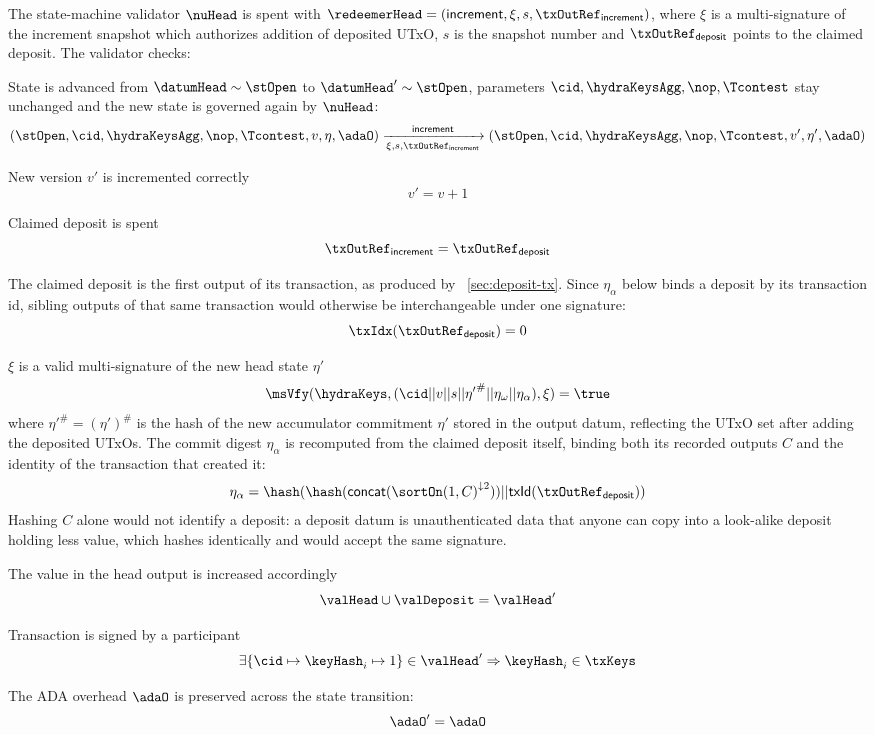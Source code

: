 \noindent The state-machine validator $\nuHead$ is spent with
$\redeemerHead = (\mathsf{increment}, \xi, s, \txOutRef_{\mathsf{increment}})$,
where $\xi$ is a multi-signature of the increment snapshot which authorizes
addition of deposited UTxO, $s$ is the snapshot number and
$\txOutRef_{\mathsf{deposit}}$ points to the claimed deposit. The validator
checks:
\begin{menumerate}
	\item State is advanced from $\datumHead \sim \stOpen$ to
	$\datumHead' \sim \stOpen$, parameters $\cid,\hydraKeysAgg,\nop,\Tcontest$
	stay unchanged and the new state is governed again by $\nuHead$:
	\[
		(\stOpen,\cid,\hydraKeysAgg,\nop,\Tcontest,v,\eta,\adaO) \xrightarrow[\xi, s, \txOutRef_{\mathsf{increment}}]{\mathsf{increment}} (\stOpen,\cid,\hydraKeysAgg,\nop,\Tcontest,v',\eta',\adaO)
	\]
	\item New version $v'$ is incremented correctly
	\[
		v' = v + 1
	\]
	\item Claimed deposit is spent
	\[
		\txOutRef_{\mathsf{increment}} = \txOutRef_{\mathsf{deposit}}
	\]
	\item The claimed deposit is the first output of its transaction, as produced
	by \mtxDeposit{}~\ref{sec:deposit-tx}. Since $\eta_{\alpha}$ below binds a
	deposit by its transaction id, sibling outputs of that same transaction would
	otherwise be interchangeable under one signature:
	\[
		\txIdx(\txOutRef_{\mathsf{deposit}}) = 0
	\]
	\item $\xi$ is a valid multi-signature of the new head state $\eta'$
	\[
		\msVfy(\hydraKeys,(\cid || v || s || {\eta'}^{\#} || \eta_{\omega} || \eta_{\alpha}),\xi) = \true
	\]
	where ${\eta'}^{\#} = (\eta')^{\#}$ is the hash of the new accumulator commitment $\eta'$
	stored in the output datum, reflecting the UTxO set after adding the deposited UTxOs.
	The commit digest $\eta_{\alpha}$ is recomputed from the claimed deposit itself,
	binding both its recorded outputs $C$ and the identity of the transaction that
	created it:
	\[
		\eta_{\alpha} = \hash(\hash(\mathsf{concat}({\sortOn(1, C)}^{\downarrow2})) || \mathsf{txId}(\txOutRef_{\mathsf{deposit}}))
	\]
	Hashing $C$ alone would not identify a deposit: a deposit datum is
	unauthenticated data that anyone can copy into a look-alike deposit holding
	less value, which hashes identically and would accept the same signature.
	\item The value in the head output is increased accordingly
	\[
		\valHead \cup \valDeposit = \valHead'
	\]
	\item Transaction is signed by a participant
	\[
		\exists \{\cid \mapsto \keyHash_{i} \mapsto 1\} \in \valHead' \Rightarrow \keyHash_{i} \in \txKeys
	\]
	\item The ADA overhead $\adaO$ is preserved across the state transition:
	\[
		\adaO' = \adaO
	\]
\end{menumerate}


